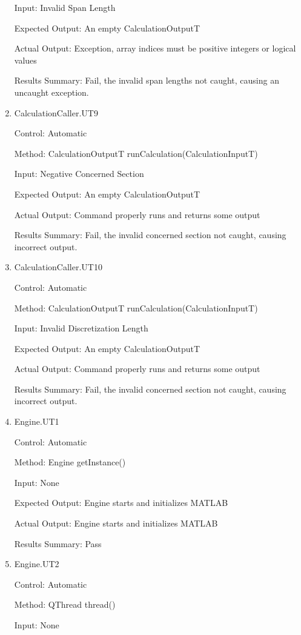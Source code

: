 \documentclass[12pt, titlepage]{article}
\begin{document}
\begin{enumerate}
  Input: Invalid Span Length

  Expected Output: An empty CalculationOutputT

  Actual Output: Exception, array indices must be positive integers or logical values

  Results Summary: Fail, the invalid span lengths not caught, causing an uncaught exception.

  \item {CalculationCaller.UT9}

  Control: Automatic

  Method: CalculationOutputT runCalculation(CalculationInputT)

  Input: Negative Concerned Section

  Expected Output: An empty CalculationOutputT

  Actual Output: Command properly runs and returns some output

  Results Summary: Fail, the invalid concerned section not caught, causing incorrect output.

  \item {CalculationCaller.UT10}

  Control: Automatic

  Method: CalculationOutputT runCalculation(CalculationInputT)

  Input: Invalid Discretization Length

  Expected Output: An empty CalculationOutputT

  Actual Output: Command properly runs and returns some output

  Results Summary: Fail, the invalid concerned section not caught, causing incorrect output.

  \item {Engine.UT1}

  Control: Automatic

  Method: Engine getInstance()

  Input: None

  Expected Output: Engine starts and initializes MATLAB

  Actual Output: Engine starts and initializes MATLAB

  Results Summary: Pass

  \item {Engine.UT2}

  Control: Automatic

  Method: QThread thread()

  Input: None


\end{enumerate}
\end{document}
